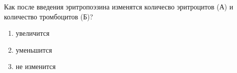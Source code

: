 Как после введения эритропоэзина изменятся количесво эритроцитов (А) и количество тромбоцитов (Б)? \\
\begin{enumerate}
    \item увеличится
    \item уменьшится
    \item не изменится
\end{enumerate}

